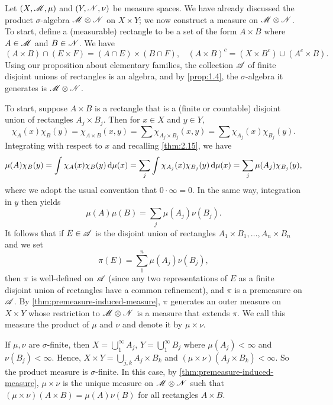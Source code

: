 \documentclass[12pt]{article} %
\begin{document}
Let $(X, \mathscr{M}, \mu)$ and $(Y, \mathscr{N}, \nu)$ be measure spaces. We have already discussed the product $\sigma$-algebra $\mathscr{M} \otimes \mathscr{N}$ on $X \times Y$; we now construct a measure on $\mathscr{M} \otimes \mathscr{N}$. To start, define a (measurable) rectangle to be a set of the form $A \times B$ where $A \in \mathscr{M}$ and $B \in \mathscr{N}$. We have \[(A \times B) \cap (E \times F) = (A \cap E) \times (B \cap F), \ \ \ \ (A \times B)^c = (X \times B^c) \cup (A^c \times B).\] Using our proposition about elementary families, the collection $\mathscr{A}$ of finite disjoint unions of rectangles is an algebra, and by \cref{prop:1.4}, the $\sigma$-algebra it generates is $\mathscr{M} \otimes \mathscr{N}$.

To start, suppose $A \times B$ is a rectangle that is a (finite or countable) disjoint union of rectangles $A_j \times B_j$. Then for $x \in X$ and $y \in Y$, \[\chi_A(x) \chi_B(y) = \chi_{A \times B} (x, y) = \sum \chi_{A_j \times B_j}(x, y) = \sum \chi_{A_j} (x) \chi_{B_j}(y).\] Integrating with respect to $x$ and recalling \cref{thm:2.15}, we have \begin{align*}
    \mu(A) \chi_B(y) = \int \chi_A(x)\chi_B(y) \, \mathrm{d} \mu(x) = \sum_j \int \chi_{A_j} (x) \chi_{B_j}(y) \, \mathrm{d} \mu(x) = \sum_j \mu(A_j) \chi_{B_j}(y),
\end{align*}
where we adopt the usual convention that $0 \cdot \infty = 0$.
In the same way, integration in $y$ then yields \[\mu(A) \mu(B) = \sum_j \mu(A_j) \nu(B_j).\]
It follows that if $E \in \mathscr{A}$ is the disjoint union of rectangles $A_1 \times B_1, \ldots, A_n \times B_n$ and we set \[\pi(E) = \sum_1^n \mu(A_j)\nu(B_j),\] then $\pi$ is well-defined on $\mathscr{A}$ (since any two representations of $E$ as a finite disjoint union of rectangles have a common refinement), and $\pi$ is a premeasure on $\mathscr{A}$. By \cref{thm:premeasure-induced-measure}, $\pi$ generates an outer measure on $X \times Y$ whose restriction to $\mathscr{M} \otimes \mathscr{N}$ is a measure that extends $\pi$. We call this measure the product of $\mu$ and $\nu$ and denote it by $\mu \times \nu$.

If $\mu, \nu$ are $\sigma$-finite, then $X = \bigcup_1^\infty A_j$, $Y = \bigcup_1^\infty B_j$ where $\mu(A_j) < \infty$ and $\nu(B_j) < \infty$. Hence, $X \times Y = \bigcup_{j,k} A_j \times B_k$ and $(\mu \times \nu)(A_j \times B_k) < \infty$. So the product measure is $\sigma$-finite. In this case, by \cref{thm:premeasure-induced-measure}, $\mu \times \nu$ is the unique measure on $\mathscr{M} \otimes \mathscr{N}$ such that $(\mu \times \nu)(A \times B) = \mu(A)\nu(B)$ for all rectangles $A \times B$.
\end{document}
